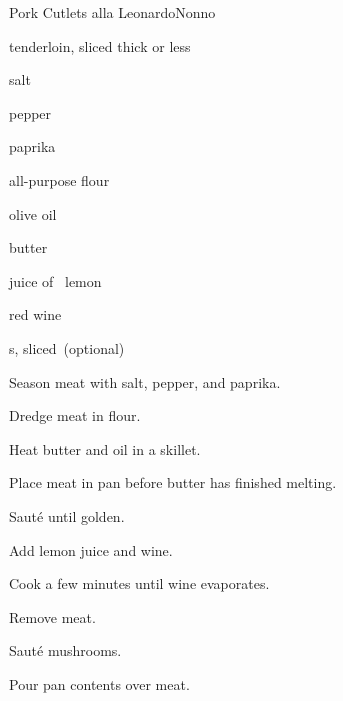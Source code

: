 \begin{recipe}{Pork Cutlets alla Leonardo}{Nonno}{}

\begin{ingredients}
\item {} tenderloin, sliced \inch{\quarter} thick or less
\item salt
\item pepper
\item paprika
\item all-purpose flour
\item olive oil
\item {} butter
\item juice of \half{}~lemon
\item \C{\half} red wine
\item {}s, sliced~(optional)
\end{ingredients}

\begin{directions}
\item Season meat with salt, pepper, and paprika.
\item Dredge meat in flour.
\item Heat butter and oil in a skillet.
\item Place meat in pan before butter has finished melting.
\item Saut\'e until golden.
\item Add lemon juice and wine.
\item Cook a few minutes until wine evaporates.
\item Remove meat.
\item Saut\'e mushrooms.
\item Pour pan contents over meat.
\end{directions}

\end{recipe}
